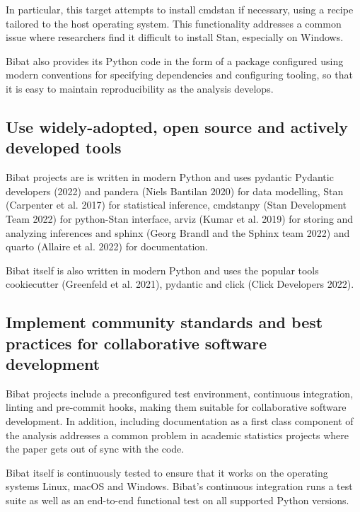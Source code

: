 \documentclass[
  letterpaper,
  DIV=11,
  numbers=noendperiod]{scrartcl}
\begin{document}
In particular, this target attempts to install cmdstan if necessary,
using a recipe tailored to the host operating system. This functionality
addresses a common issue where researchers find it difficult to install
Stan, especially on Windows.

Bibat also provides its Python code in the form of a package configured
using modern conventions for specifying dependencies and configuring
tooling, so that it is easy to maintain reproducibility as the analysis
develops.

\subsection{Use widely-adopted, open source and actively developed
tools}\label{use-widely-adopted-open-source-and-actively-developed-tools}

Bibat projects are is written in modern Python and uses pydantic
Pydantic developers (2022) and pandera (Niels Bantilan 2020) for data
modelling, Stan (Carpenter et al. 2017) for statistical inference,
cmdstanpy (Stan Development Team 2022) for python-Stan interface, arviz
(Kumar et al. 2019) for storing and analyzing inferences and sphinx
(Georg Brandl and the Sphinx team 2022) and quarto (Allaire et al. 2022)
for documentation.

Bibat itself is also written in modern Python and uses the popular tools
cookiecutter (Greenfeld et al. 2021), pydantic and click (Click
Developers 2022).

\subsection{Implement community standards and best practices for
collaborative software
development}\label{implement-community-standards-and-best-practices-for-collaborative-software-development}

Bibat projects include a preconfigured test environment, continuous
integration, linting and pre-commit hooks, making them suitable for
collaborative software development. In addition, including documentation
as a first class component of the analysis addresses a common problem in
academic statistics projects where the paper gets out of sync with the
code.

Bibat itself is continuously tested to ensure that it works on the
operating systems Linux, macOS and Windows. Bibat's continuous
integration runs a test suite as well as an end-to-end functional test
on all supported Python versions.
\end{document}
